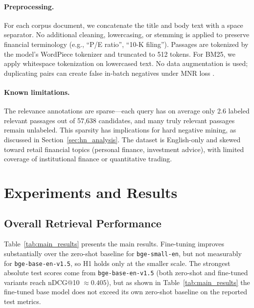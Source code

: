 \documentclass{article} %
\begin{document}
\paragraph{Preprocessing.}
For each corpus document, we concatenate the title and body text with a space separator.
No additional cleaning, lowercasing, or stemming is applied to preserve financial terminology (e.g., ``P/E ratio'', ``10-K filing'').
Passages are tokenized by the model's WordPiece tokenizer and truncated to 512 tokens.
For BM25, we apply whitespace tokenization on lowercased text.
No data augmentation is used; duplicating pairs can create false in-batch negatives under MNR loss \citep{qu2021rocketqa}.

\paragraph{Known limitations.}
The relevance annotations are sparse---each query has on average only 2.6 labeled relevant passages out of 57,638 candidates, and many truly relevant passages remain unlabeled.
This sparsity has implications for hard negative mining, as discussed in Section~\ref{sec:hn_analysis}.
The dataset is English-only and skewed toward retail financial topics (personal finance, investment advice), with limited coverage of institutional finance or quantitative trading.

\section{Experiments and Results}

\subsection{Overall Retrieval Performance}

Table~\ref{tab:main_results} presents the main results.
Fine-tuning improves substantially over the zero-shot baseline for \texttt{bge-small-en}, but not measurably for \texttt{bge-base-en-v1.5}, so H1 holds only at the smaller scale.
The strongest absolute test scores come from \texttt{bge-base-en-v1.5} (both zero-shot and fine-tuned variants reach nDCG@10 $\approx 0.405$), but as shown in Table~\ref{tab:main_results} the fine-tuned base model does not exceed its own zero-shot baseline on the reported test metrics.
\end{document}

